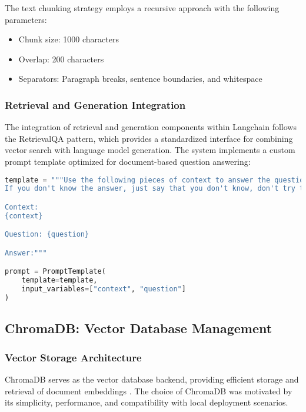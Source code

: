The text chunking strategy employs a recursive approach with the following parameters:
\begin{itemize}
    \item Chunk size: 1000 characters
    \item Overlap: 200 characters
    \item Separators: Paragraph breaks, sentence boundaries, and whitespace
\end{itemize}

\subsubsection{Retrieval and Generation Integration}

The integration of retrieval and generation components within Langchain follows the RetrievalQA pattern, which provides a standardized interface for combining vector search with language model generation. The system implements a custom prompt template optimized for document-based question answering:

\begin{lstlisting}[language=Python, caption=Custom Prompt Template Implementation]
template = """Use the following pieces of context to answer the question at the end. 
If you don't know the answer, just say that you don't know, don't try to make up an answer.

Context:
{context}

Question: {question}

Answer:"""

prompt = PromptTemplate(
    template=template,
    input_variables=["context", "question"]
)
\end{lstlisting}

\subsection{ChromaDB: Vector Database Management}

\subsubsection{Vector Storage Architecture}

ChromaDB serves as the vector database backend, providing efficient storage and retrieval of document embeddings \citep{chromadb2024}. The choice of ChromaDB was motivated by its simplicity, performance, and compatibility with local deployment scenarios.

